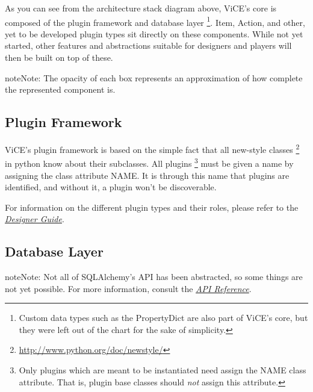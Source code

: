 \documentclass[letterpaper,10pt,english]{sphinxmanual}
\begin{document}
As you can see from the architecture stack diagram above, ViCE's core is
composed of the plugin framework and database layer \footnote{
Custom data types such as the PropertyDict are also part of ViCE's
core, but they were left out of the chart for the sake of simplicity.
}. Item, Action, and other,
yet to be developed plugin types sit directly on these components. While not
yet started, other features and abstractions suitable for designers and
players will then be built on top of these.

\begin{notice}{note}{Note:}
The opacity of each box represents an approximation of how complete the
represented component is.
\end{notice}


\subsection{Plugin Framework}
\label{developer_guide/architecture:plugin-framework}
ViCE's plugin framework is based on the simple fact that all new-style
classes \footnote{
\href{http://www.python.org/doc/newstyle/}{http://www.python.org/doc/newstyle/}
} in python know about their subclasses. All plugins \footnote{
Only plugins which are meant to be instantiated need assign the NAME
class attribute. That is, plugin base classes should \emph{not} assign
this attribute.
} must
be given a name by assigning the class attribute NAME. It is through this
name that plugins are identified, and without it, a plugin won't be
discoverable.

For information on the different plugin types and their roles, please
refer to the {\hyperref[designer_guide/designer_index::doc]{\emph{Designer Guide}}}.


\subsection{Database Layer}
\label{developer_guide/architecture:database-layer}
\begin{notice}{note}{Note:}
Not all of SQLAlchemy's API has been abstracted, so some things are
not yet possible. For more information, consult the {\hyperref[api_reference::doc]{\emph{API Reference}}}.
\end{notice}
\end{document}

